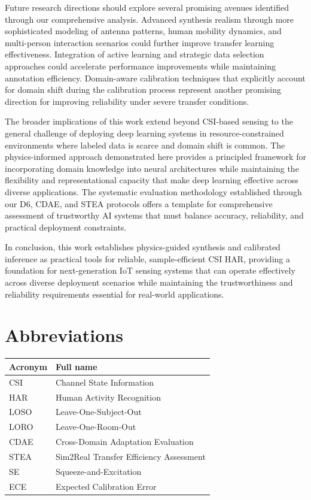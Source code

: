 \documentclass[journal]{IEEEtran}
\begin{document}
Future research directions should explore several promising avenues identified through our comprehensive analysis. Advanced synthesis realism through more sophisticated modeling of antenna patterns, human mobility dynamics, and multi-person interaction scenarios could further improve transfer learning effectiveness. Integration of active learning and strategic data selection approaches could accelerate performance improvements while maintaining annotation efficiency. Domain-aware calibration techniques that explicitly account for domain shift during the calibration process represent another promising direction for improving reliability under severe transfer conditions.

The broader implications of this work extend beyond CSI-based sensing to the general challenge of deploying deep learning systems in resource-constrained environments where labeled data is scarce and domain shift is common. The physics-informed approach demonstrated here provides a principled framework for incorporating domain knowledge into neural architectures while maintaining the flexibility and representational capacity that make deep learning effective across diverse applications. The systematic evaluation methodology established through our D6, CDAE, and STEA protocols offers a template for comprehensive assessment of trustworthy AI systems that must balance accuracy, reliability, and practical deployment constraints.

In conclusion, this work establishes physics-guided synthesis and calibrated inference as practical tools for reliable, sample-efficient CSI HAR, providing a foundation for next-generation IoT sensing systems that can operate effectively across diverse deployment scenarios while maintaining the trustworthiness and reliability requirements essential for real-world applications.

\section*{Abbreviations}
\begin{table}[h]
\centering
\begin{tabular}{@{}ll@{}}
\toprule
\textbf{Acronym} & \textbf{Full name} \\
\midrule
CSI & Channel State Information \\
HAR & Human Activity Recognition \\
LOSO & Leave-One-Subject-Out \\
LORO & Leave-One-Room-Out \\
CDAE & Cross-Domain Adaptation Evaluation \\
STEA & Sim2Real Transfer Efficiency Assessment \\
SE & Squeeze-and-Excitation \\
ECE & Expected Calibration Error \\
\bottomrule
\end{tabular}
\end{table}



\end{document}
